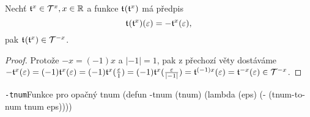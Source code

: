 \begin{consequence}\label{dusl:negace_tnumu}
Nechť $\mathfrak{t}^{x}\in\mathcal{T}^{x}, x\in\mathbb{R}$ a funkce $\mathfrak{t}^{}(\mathfrak{t}^{x})$ má předpis
\begin{equation}
\mathfrak{t}^{}(\mathfrak{t}^{x})(\varepsilon)=-\mathfrak{t}^{x}(\varepsilon),
\end{equation}
pak $\mathfrak{t}^{}(\mathfrak{t}^{x})\in\mathcal{T}^{-x}$.
\begin{proof}
Protože $-x = (-1)x$ a $|-1|=1$, pak z přechozí věty dostáváme $-\mathfrak{t}^{x}(\varepsilon)=(-1)\mathfrak{t}^{x}(\varepsilon)=(-1)\mathfrak{t}^{x}(\frac{\varepsilon}{1})=(-1)\mathfrak{t}^{x}(\frac{\varepsilon}{|-1|})=\mathfrak{t}^{(-1)x}(\varepsilon)=\mathfrak{t}^{-x}(\varepsilon)\in\mathcal{T}^{-x}$.
\end{proof}
\end{consequence}

\begin{lispcode}{\texttt{-tnum}}{Funkce pro opačný tnum}
(\textcolor{funkcionalni}{defun} \textcolor{pojmenovan}{-tnum} (tnum)
  (\textcolor{funkcionalni}{lambda} (eps)
    (\textcolor{matematicke}{-} (\textcolor{moje}{tnum-to-num} tnum eps))))
\end{lispcode}

